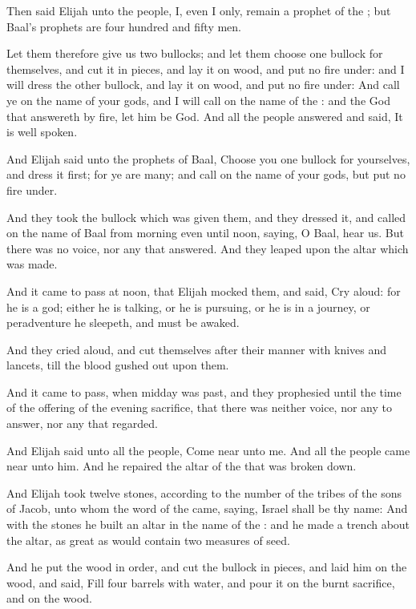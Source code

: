 \Verse Then said Elijah unto the people, I, even I only, remain a prophet of the \LORD; but Baal's prophets are four hundred and fifty men.

\Verse Let them therefore give us two bullocks; and let them choose one bullock for themselves, and cut it in pieces, and lay it on wood, and put no fire under: and I will dress the other bullock, and lay it on wood, and put no fire under: \Verse And call ye on the name of your gods, and I will call on the name of the \LORD: and the God that answereth by fire, let him be God. And all the people answered and said, It is well spoken.

\Verse And Elijah said unto the prophets of Baal, Choose you one bullock for yourselves, and dress it first; for ye are many; and call on the name of your gods, but put no fire under.

\Verse And they took the bullock which was given them, and they dressed it, and called on the name of Baal from morning even until noon, saying, O Baal, hear us. But there was no voice, nor any that answered. And they leaped upon the altar which was made.

\Verse And it came to pass at noon, that Elijah mocked them, and said, Cry aloud: for he is a god; either he is talking, or he is pursuing, or he is in a journey, or peradventure he sleepeth, and must be awaked.

\Verse And they cried aloud, and cut themselves after their manner with knives and lancets, till the blood gushed out upon them.

\Verse And it came to pass, when midday was past, and they prophesied until the time of the offering of the evening sacrifice, that there was neither voice, nor any to answer, nor any that regarded.

\Verse And Elijah said unto all the people, Come near unto me. And all the people came near unto him. And he repaired the altar of the \LORD that was broken down.

\Verse And Elijah took twelve stones, according to the number of the tribes of the sons of Jacob, unto whom the word of the \LORD came, saying, Israel shall be thy name: \Verse And with the stones he built an altar in the name of the \LORD: and he made a trench about the altar, as great as would contain two measures of seed.

\Verse And he put the wood in order, and cut the bullock in pieces, and laid him on the wood, and said, Fill four barrels with water, and pour it on the burnt sacrifice, and on the wood.

